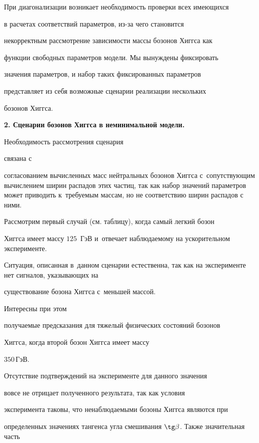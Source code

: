 При диагонализации возникает необходимость проверки всех имеющихся

в расчетах соответствий параметров, из-за чего становится

некорректным рассмотрение зависимости массы бозонов Хиггса как

функции свободных параметров модели. Мы вынуждены фиксировать

значения параметров, и набор таких фиксированных параметров

представляет из себя возможные сценарии реализации нескольких

бозонов Хиггса.



\smallskip



\textbf{2. Сценарии бозонов Хиггса в неминимальной модели.}

Необходимость рассмотрения сценария 


связана с 


согласованием вычисленных масс нейтральных бозонов Хиггса с~сопутствующим вычислением ширин распадов этих частиц, так как набор значений параметров может приводить к~требуемым массам, но не соответствию ширин распадов с ними.



Рассмотрим первый случай (см. таблицу), когда самый легкий бозон

Хиг\-гса имеет массу $125$~ГэВ и~отвечает наблюдаемому на ускорительном эксперименте. 

Ситуация, описанная в~данном сценарии естественна, так как на эксперименте нет сигналов, указывающих на

существование бозона Хиггса с~меньшей массой. 

Интересны при этом

получаемые предсказания для тяжелый физических состояний бозонов

Хиггса, когда второй бозон Хиггса имеет массу


$350$\,ГэВ.

Отсутствие подтверждений на эксперименте для данного значения

вовсе не отрицает полученного результата, так как условия

эксперимента таковы, что ненаблюдаемыми бозоны Хиггса являются при

определенных значениях тангенса угла смешивания $\tg\beta$. Также значительная часть 

